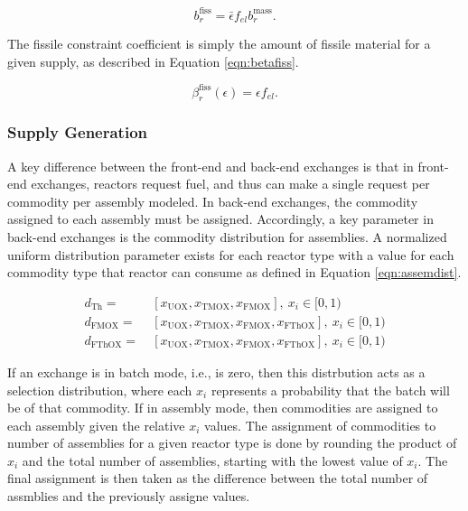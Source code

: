 \begin{equation}\label{eqn:bfiss}
b^{\text{fiss}}_r = \bar{\epsilon} f_{el} b^{\text{mass}}_r.
\end{equation}

The fissile constraint coefficient is simply the amount of fissile material for
a given supply, as described in Equation \ref{eqn:betafiss}.

\begin{equation}\label{eqn:betafiss}
\beta^{\text{fiss}}_r(\epsilon) = \epsilon f_{el}.
\end{equation}

\subsubsection{Supply Generation}

A key difference between the front-end and back-end exchanges is that in
front-end exchanges, reactors request fuel, and thus can make a single request
per commodity per assembly modeled. In back-end exchanges, the commodity
assigned to each assembly must be assigned. Accordingly, a key parameter in
back-end exchanges is the commodity distribution for assemblies. A normalized
uniform distribution parameter exists for each reactor type with a value for
each commodity type that reactor can consume as defined in Equation
\ref{eqn:assemdist}.

\begin{equation}\label{eqn:assemdist}
\begin{split}
d_{\text{Th}} = & \:
[x_{\text{UOX}}, x_{\text{TMOX}}, x_{\text{FMOX}}], \: x_i \in [0, 1) \\
d_{\text{FMOX}} = & \:
[x_{\text{UOX}}, x_{\text{TMOX}}, x_{\text{FMOX}}, x_{\text{FThOX}}], \: x_i \in [0, 1) \\
d_{\text{FThOX}} = & \:
[x_{\text{UOX}}, x_{\text{TMOX}}, x_{\text{FMOX}}, x_{\text{FThOX}}], \: x_i \in [0, 1) 
\end{split}
\end{equation}

If an exchange is in batch mode, i.e., \frx is zero, then this distrbution
acts as a selection distribution, where each $x_i$ represents a probability that
the batch will be of that commodity. If in assembly mode, then commodities are
assigned to each assembly given the relative $x_i$ values.  The assignment of
commodities to number of assemblies for a given reactor type is done by rounding
the product of $x_i$ and the total number of assemblies, starting with the
lowest value of $x_i$. The final assignment is then taken as the difference
between the total number of assmblies and the previously assigne values.

